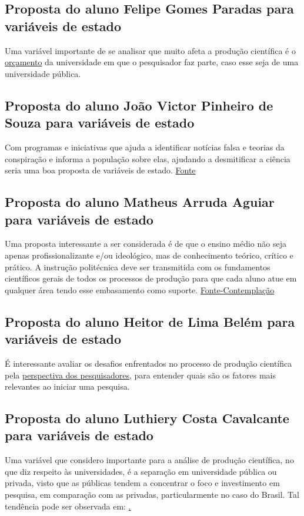 \subsection{Proposta do aluno Felipe Gomes Paradas para variáveis de estado}
Uma variável importante de se analisar que muito afeta a produção científica é o \href{https://www.gov.br/economia/pt-br/assuntos/planejamento-e-orcamento/orcamento}{orçamento} da universidade em que o pesquisador faz parte, caso esse seja de uma universidade pública.


\subsection{Proposta do aluno João Victor Pinheiro de Souza para variáveis de estado}

Com programas e iniciativas que ajuda a identificar notícias falsa e teorias da conspiração e informa a população sobre elas, ajudando a desmitificar a ciência seria uma boa proposta de variáveis de estado.
\href{https://revistapesquisa.fapesp.br/resistencia-a-ciencia/}{Fonte}

\subsection{Proposta do aluno Matheus Arruda Aguiar para variáveis de estado}
Uma proposta interessante a ser considerada é de que o ensino médio não seja apenas profissionalizante e/ou ideológico, mas de conhecimento teórico, crítico e prático. A instrução politécnica deve ser transmitida com os fundamentos científicos gerais de todos os processos de produção para que cada aluno atue em qualquer área tendo esse embasamento como suporte. \href{https://monografias.brasilescola.uol.com.br/pedagogia/influencia-globalizacao-praticas-educativas-e-reformulacao-conteudos.htm}{Fonte-Contemplação}


\subsection{Proposta do aluno Heitor de Lima Belém para variáveis de estado}
É interessante avaliar os desafios enfrentados no processo de produção científica pela \href{https://www.scielo.br/j/ep/a/WgdZnSMrX49LLTJMffmsqNK/?lang=pt}{perspectiva dos pesquisadores}, para entender quais são os fatores mais relevantes ao iniciar uma pesquisa.

\subsection{Proposta do aluno Luthiery Costa Cavalcante para variáveis de estado}
Uma variável que considero importante para a análise de produção científica, no que diz respeito às universidades, é a separação em universidade pública ou privada, visto que as públicas tendem a concentrar o foco e investimento em pesquisa, em comparação com as privadas, particularmente no caso do Brasil. Tal tendência pode ser observada em: \href{https://ruf.folha.uol.com.br/2019/ranking-de-universidades/pesquisa/}.

